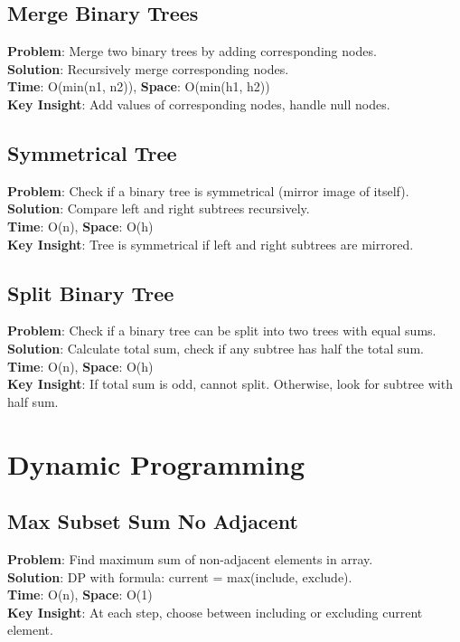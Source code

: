 \documentclass{report}
\begin{document}
\subsection{Merge Binary Trees}
\textbf{Problem}: Merge two binary trees by adding corresponding nodes.\\
\textbf{Solution}: Recursively merge corresponding nodes.\\
\textbf{Time}: O(min(n1, n2)), \textbf{Space}: O(min(h1, h2))\\
\textbf{Key Insight}: Add values of corresponding nodes, handle null nodes.

\subsection{Symmetrical Tree}
\textbf{Problem}: Check if a binary tree is symmetrical (mirror image of itself).\\
\textbf{Solution}: Compare left and right subtrees recursively.\\
\textbf{Time}: O(n), \textbf{Space}: O(h)\\
\textbf{Key Insight}: Tree is symmetrical if left and right subtrees are mirrored.

\subsection{Split Binary Tree}
\textbf{Problem}: Check if a binary tree can be split into two trees with equal sums.\\
\textbf{Solution}: Calculate total sum, check if any subtree has half the total sum.\\
\textbf{Time}: O(n), \textbf{Space}: O(h)\\
\textbf{Key Insight}: If total sum is odd, cannot split. Otherwise, look for subtree with half sum.

\section{Dynamic Programming}

\subsection{Max Subset Sum No Adjacent}
\textbf{Problem}: Find maximum sum of non-adjacent elements in array.\\
\textbf{Solution}: DP with formula: current = max(include, exclude).\\
\textbf{Time}: O(n), \textbf{Space}: O(1)\\
\textbf{Key Insight}: At each step, choose between including or excluding current element.
\end{document}
